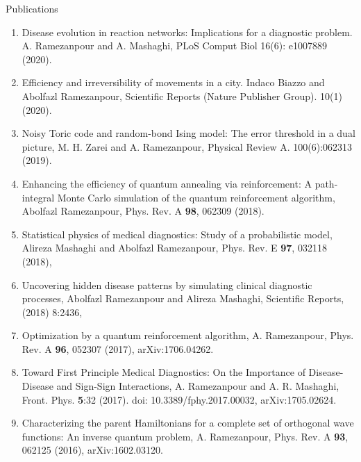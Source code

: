 \documentclass[aps,preprint]{revtex4-1}
\begin{document}
\begin{center}
\begin{large}Publications\end{large}
\end{center}


\begin{enumerate}


\item Disease evolution in reaction networks: Implications for a diagnostic problem. A. Ramezanpour and A. Mashaghi, PLoS Comput Biol 16(6): e1007889 (2020).
  
\item Efficiency and irreversibility of movements in a city. Indaco Biazzo and Abolfazl Ramezanpour, Scientific Reports (Nature Publisher Group). 10(1) (2020). 

\item Noisy Toric code and random-bond Ising model: The error threshold in a dual picture, M. H. Zarei and A. Ramezanpour, Physical Review A. 100(6):062313 (2019). 

\item Enhancing the efficiency of quantum annealing via reinforcement: A path-integral Monte Carlo
simulation of the quantum reinforcement algorithm, Abolfazl Ramezanpour, Phys. Rev. A \textbf{98}, 062309 (2018).


\item Statistical physics of medical diagnostics: Study of a probabilistic model, Alireza Mashaghi and Abolfazl Ramezanpour, Phys. Rev. E \textbf{97}, 032118 (2018),


\item Uncovering hidden disease patterns by simulating clinical diagnostic processes, Abolfazl Ramezanpour and Alireza Mashaghi, Scientific Reports, (2018) 8:2436,


\item Optimization by a quantum reinforcement algorithm, A. Ramezanpour, Phys. Rev. A \textbf{96}, 052307 (2017),  arXiv:1706.04262.

\item Toward First Principle Medical Diagnostics: On the Importance of Disease-Disease and Sign-Sign Interactions, A. Ramezanpour and A. R. Mashaghi, Front. Phys. \textbf{5}:32 (2017). doi: 10.3389/fphy.2017.00032,  arXiv:1705.02624.

\item  Characterizing the parent Hamiltonians for a complete set of orthogonal wave functions: An inverse quantum problem, A. Ramezanpour, Phys. Rev. A \textbf{93}, 062125 (2016),  arXiv:1602.03120.


\end{enumerate}
\end{document}
